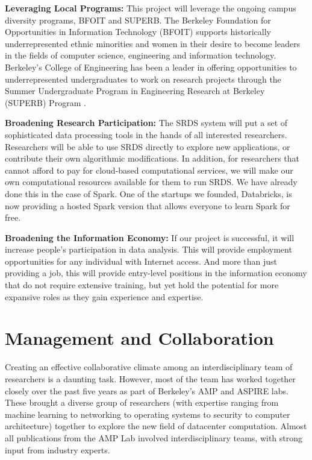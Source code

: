 {\bf Leveraging  Local Programs:} This project will leverage the ongoing campus diversity programs, BFOIT and SUPERB. The Berkeley Foundation for Opportunities in Information Technology (BFOIT) \cite{bfoit} supports historically underrepresented ethnic minorities and women in their desire to become leaders in the fields of computer science, engineering and information technology. 
Berkeley's College of Engineering has been a leader in offering opportunities to underrepresented undergraduates to work on research projects through the Summer Undergraduate Program in Engineering Research at Berkeley (SUPERB) Program \cite{superb}.  

{\bf Broadening Research Participation:} The SRDS system will put a set of sophisticated data processing tools in the hands of all interested researchers.  Researchers will be able to use SRDS directly to explore new applications, or contribute their own algorithmic modifications.  In addition, for researchers that cannot afford to pay for cloud-based computational services, we will make our own computational resources available for them to run SRDS. We have already done this in the case of Spark. One of the startups we founded, Databricks, is now providing a hosted Spark version that allows everyone to learn Spark for free.

{\bf Broadening the Information Economy:} If our project is successful, it will increase people's participation in data analysis.  This will provide employment opportunities for any individual with Internet access.  And more than just providing a job, this will provide entry-level positions in the information economy that do not require extensive training, but yet hold the potential for more expansive roles as they gain experience and expertise.  

\section{Management and Collaboration}

Creating an effective collaborative climate among an interdisciplinary team of researchers is a daunting task. However, most of the team has worked together closely over the past five years as part of Berkeley's AMP and ASPIRE labs.  These brought a diverse group of researchers (with expertise ranging from machine learning to networking to operating systems to security to computer architecture) together to explore the new field of datacenter computation. Almost all publications from the AMP Lab involved interdisciplinary teams, with strong input from industry experts.

